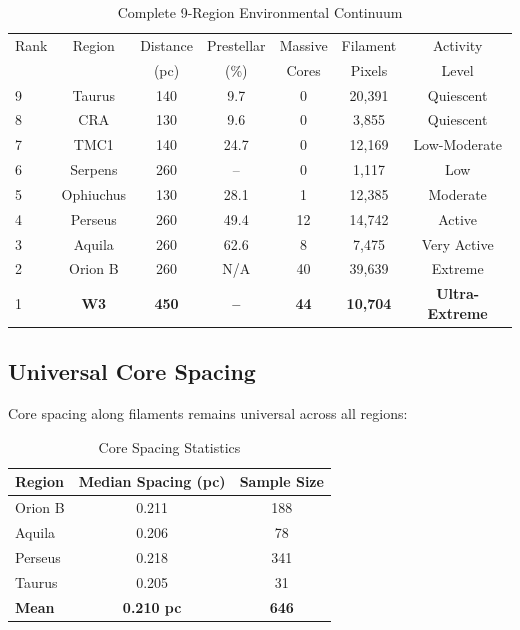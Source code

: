 \documentclass[11pt,a4paper]{article}
\begin{document}
\begin{table}[H]
\centering
\caption{Complete 9-Region Environmental Continuum}
\begin{tabular}{lcccccc}
\toprule
Rank & Region & Distance & Prestellar & Massive & Filament & Activity \\
     &        & (pc)    & (\%)    & Cores  & Pixels & Level \\
\midrule
9  & Taurus   & 140     & 9.7     & 0      & 20,391   & Quiescent \\
8  & CRA      & 130     & 9.6     & 0      & 3,855    & Quiescent \\
7  & TMC1     & 140     & 24.7    & 0      & 12,169   & Low-Moderate \\
6  & Serpens  & 260     & --      & 0      & 1,117   & Low \\
5  & Ophiuchus& 130     & 28.1    & 1      & 12,385   & Moderate \\
4  & Perseus  & 260     & 49.4    & 12     & 14,742   & Active \\
3  & Aquila   & 260     & 62.6    & 8      & 7,475    & Very Active \\
2  & Orion B  & 260     & N/A     & 40     & 39,639   & Extreme \\
1  & \textbf{W3}    & \textbf{450}     & \textbf{--}    & \textbf{44}     & \textbf{10,704}  & \textbf{Ultra-Extreme} \\
\bottomrule
\end{tabular}
\end{table}

\subsection{Universal Core Spacing}

Core spacing along filaments remains universal across all regions:

\begin{table}[H]
\centering
\caption{Core Spacing Statistics}
\begin{tabular}{lcc}
\toprule
Region & Median Spacing (pc) & Sample Size \\
\midrule
Orion B  & 0.211 & 188 \\
Aquila  & 0.206 & 78 \\
Perseus & 0.218 & 341 \\
Taurus  & 0.205 & 31 \\
\midrule
\textbf{Mean} & \textbf{0.210 pc} & \textbf{646} \\
\bottomrule
\end{tabular}
\end{table}
\end{document}
